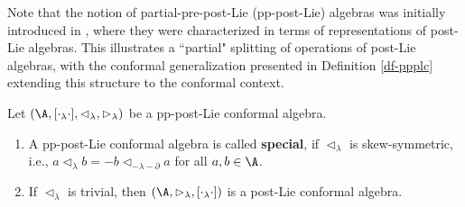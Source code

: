 \documentclass[12pt]{amsart}
\begin{document}
\begin{remark}
   Note that the notion of partial-pre-post-Lie (pp-post-Lie) algebras was initially introduced in \cite{LBG}, where they were characterized in terms of representations of post-Lie algebras. This illustrates a ``partial"
   splitting of operations of post-Lie algebras, with the conformal generalization presented in Definition \ref{df-ppplc} extending this structure to the conformal context.

Let $(\A,[\cdot_\lambda\cdot],\lhd_\lambda,\rhd_\lambda)$ be a pp-post-Lie conformal algebra.
\begin{enumerate}
    \item   A pp-post-Lie conformal algebra is called {\bf special},  if $\lhd_\lambda$ is skew-symmetric, i.e., $a\lhd_\lambda b=-b\lhd_{-\lambda-\partial}a $ for all $a,b\in \A$.
    \item If $ \lhd_\lambda$ is trivial, then $(\A,\rhd_\lambda,[\cdot_\lambda\cdot])$ is a post-Lie conformal algebra.
\end{enumerate}

\end{remark}
\end{document}
